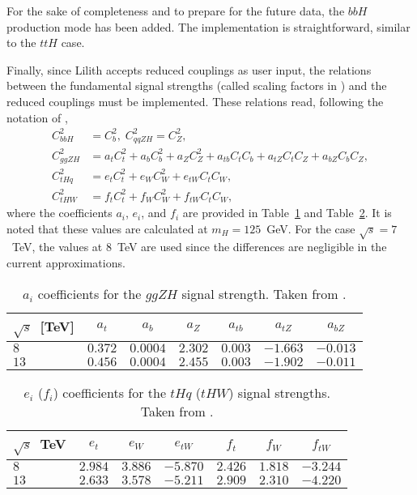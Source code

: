 For the sake of completeness and to prepare for the future data, the $bbH$ production mode has been added. The implementation 
is straightforward, similar to the $ttH$ case.

Finally, since Lilith accepts reduced couplings as user input, the relations between the fundamental signal strengths (called scaling factors in \cite{Bernon:2015hsa}) and 
the reduced couplings must be implemented. These relations read, following the notation of \cite{Bernon:2015hsa},
\begin{align}
C^2_{bbH}  &= C_b^2,\; C^2_{qqZH} = C_Z^2,\\
C^2_{ggZH} &= a_t C_t^2 + a_b C_b^2 + a_Z C_Z^2 + a_{tb} C_t C_b + a_{tZ} C_t C_Z + a_{bZ} C_b C_Z,\\ 
C^2_{tHq}  &= e_t C_t^2 + e_W C_W^2 + e_{tW} C_t C_W,\\
C^2_{tHW}  &= f_t C_t^2 + f_W C_W^2 + f_{tW} C_t C_W,  
\end{align}
where the coefficients $a_i$, $e_i$, and $f_i$ are provided in Table~\ref{tab:coeff_ggZH} and Table~\ref{tab:coeff_tH}. 
It is noted that these values are calculated at $m_H = 125$~GeV. For the case $\sqrt{s}=7$~TeV, the values at $8$~TeV are used 
since the differences are negligible in the current approximations.  
\begin{table}[h]\centering
\begin{tabular}{l | cccccc}
$\sqrt{s}$~[TeV] & $a_t$ & $a_b$ & $a_Z$ & $a_{tb}$ & $a_{tZ}$ & $a_{bZ}$ \\
\hline
$8$  & $0.372$ & $0.0004$ & $2.302$ & $0.003$ & $-1.663$ & $-0.013$\\
$13$ & $0.456$ & $0.0004$ & $2.455$ & $0.003$ & $-1.902$ & $-0.011$
\end{tabular}
\caption{$a_i$ coefficients for the $ggZH$ signal strength. Taken from \cite{deFlorian:2016spz}.} 
\label{tab:coeff_ggZH}
\end{table}
\begin{table}[h]\centering
\begin{tabular}{l | ccc|ccc}
$\sqrt{s}$~TeV & $e_t$ & $e_W$ & $e_{tW}$ & $f_{t}$ & $f_{W}$ & $f_{tW}$ \\
\hline
$8$  & $2.984$ & $3.886$ & $-5.870$ & $2.426$ & $1.818$ & $-3.244$\\
$13$ & $2.633$ & $3.578$ & $-5.211$ & $2.909$ & $2.310$ & $-4.220$
\end{tabular}
\caption{$e_i$ ($f_i$) coefficients for the $tHq$ ($tHW$) signal strengths. Taken from \cite{deFlorian:2016spz}.} 
\label{tab:coeff_tH}
\end{table}
    
   
 

